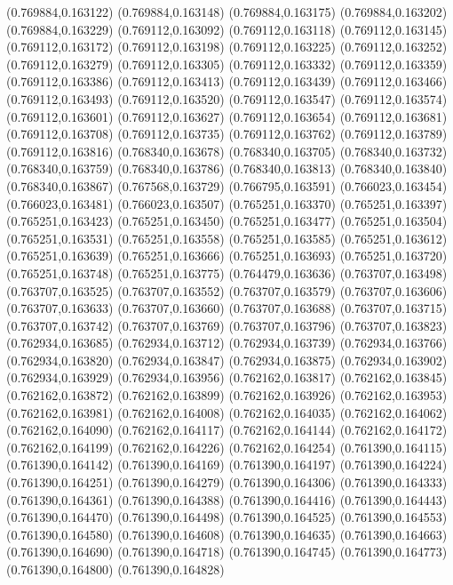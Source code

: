 (0.769884,0.163122)
(0.769884,0.163148)
(0.769884,0.163175)
(0.769884,0.163202)
(0.769884,0.163229)
(0.769112,0.163092)
(0.769112,0.163118)
(0.769112,0.163145)
(0.769112,0.163172)
(0.769112,0.163198)
(0.769112,0.163225)
(0.769112,0.163252)
(0.769112,0.163279)
(0.769112,0.163305)
(0.769112,0.163332)
(0.769112,0.163359)
(0.769112,0.163386)
(0.769112,0.163413)
(0.769112,0.163439)
(0.769112,0.163466)
(0.769112,0.163493)
(0.769112,0.163520)
(0.769112,0.163547)
(0.769112,0.163574)
(0.769112,0.163601)
(0.769112,0.163627)
(0.769112,0.163654)
(0.769112,0.163681)
(0.769112,0.163708)
(0.769112,0.163735)
(0.769112,0.163762)
(0.769112,0.163789)
(0.769112,0.163816)
(0.768340,0.163678)
(0.768340,0.163705)
(0.768340,0.163732)
(0.768340,0.163759)
(0.768340,0.163786)
(0.768340,0.163813)
(0.768340,0.163840)
(0.768340,0.163867)
(0.767568,0.163729)
(0.766795,0.163591)
(0.766023,0.163454)
(0.766023,0.163481)
(0.766023,0.163507)
(0.765251,0.163370)
(0.765251,0.163397)
(0.765251,0.163423)
(0.765251,0.163450)
(0.765251,0.163477)
(0.765251,0.163504)
(0.765251,0.163531)
(0.765251,0.163558)
(0.765251,0.163585)
(0.765251,0.163612)
(0.765251,0.163639)
(0.765251,0.163666)
(0.765251,0.163693)
(0.765251,0.163720)
(0.765251,0.163748)
(0.765251,0.163775)
(0.764479,0.163636)
(0.763707,0.163498)
(0.763707,0.163525)
(0.763707,0.163552)
(0.763707,0.163579)
(0.763707,0.163606)
(0.763707,0.163633)
(0.763707,0.163660)
(0.763707,0.163688)
(0.763707,0.163715)
(0.763707,0.163742)
(0.763707,0.163769)
(0.763707,0.163796)
(0.763707,0.163823)
(0.762934,0.163685)
(0.762934,0.163712)
(0.762934,0.163739)
(0.762934,0.163766)
(0.762934,0.163820)
(0.762934,0.163847)
(0.762934,0.163875)
(0.762934,0.163902)
(0.762934,0.163929)
(0.762934,0.163956)
(0.762162,0.163817)
(0.762162,0.163845)
(0.762162,0.163872)
(0.762162,0.163899)
(0.762162,0.163926)
(0.762162,0.163953)
(0.762162,0.163981)
(0.762162,0.164008)
(0.762162,0.164035)
(0.762162,0.164062)
(0.762162,0.164090)
(0.762162,0.164117)
(0.762162,0.164144)
(0.762162,0.164172)
(0.762162,0.164199)
(0.762162,0.164226)
(0.762162,0.164254)
(0.761390,0.164115)
(0.761390,0.164142)
(0.761390,0.164169)
(0.761390,0.164197)
(0.761390,0.164224)
(0.761390,0.164251)
(0.761390,0.164279)
(0.761390,0.164306)
(0.761390,0.164333)
(0.761390,0.164361)
(0.761390,0.164388)
(0.761390,0.164416)
(0.761390,0.164443)
(0.761390,0.164470)
(0.761390,0.164498)
(0.761390,0.164525)
(0.761390,0.164553)
(0.761390,0.164580)
(0.761390,0.164608)
(0.761390,0.164635)
(0.761390,0.164663)
(0.761390,0.164690)
(0.761390,0.164718)
(0.761390,0.164745)
(0.761390,0.164773)
(0.761390,0.164800)
(0.761390,0.164828)
